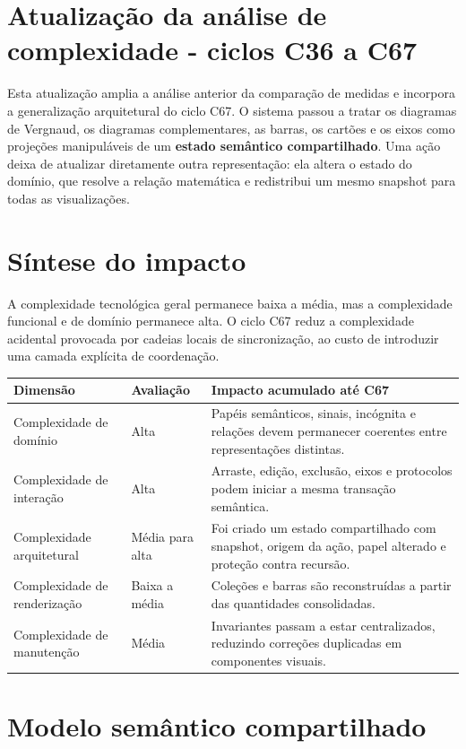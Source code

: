 \documentclass[12pt,a4paper]{article}
\begin{document}
\section*{Atualização da análise de complexidade - ciclos C36 a C67}

Esta atualização amplia a análise anterior da comparação de medidas e incorpora a generalização arquitetural do ciclo C67. O sistema passou a tratar os diagramas de Vergnaud, os diagramas complementares, as barras, os cartões e os eixos como projeções manipuláveis de um \textbf{estado semântico compartilhado}. Uma ação deixa de atualizar diretamente outra representação: ela altera o estado do domínio, que resolve a relação matemática e redistribui um mesmo snapshot para todas as visualizações.

\section{Síntese do impacto}

A complexidade tecnológica geral permanece baixa a média, mas a complexidade funcional e de domínio permanece alta. O ciclo C67 reduz a complexidade acidental provocada por cadeias locais de sincronização, ao custo de introduzir uma camada explícita de coordenação.

\begin{tabularx}{\textwidth}{p{3.8cm}p{2.8cm}X}
\toprule
\textbf{Dimensão} & \textbf{Avaliação} & \textbf{Impacto acumulado até C67}\\
\midrule
Complexidade de domínio & Alta & Papéis semânticos, sinais, incógnita e relações devem permanecer coerentes entre representações distintas.\\
Complexidade de interação & Alta & Arraste, edição, exclusão, eixos e protocolos podem iniciar a mesma transação semântica.\\
Complexidade arquitetural & Média para alta & Foi criado um estado compartilhado com snapshot, origem da ação, papel alterado e proteção contra recursão.\\
Complexidade de renderização & Baixa a média & Coleções e barras são reconstruídas a partir das quantidades consolidadas.\\
Complexidade de manutenção & Média & Invariantes passam a estar centralizados, reduzindo correções duplicadas em componentes visuais.\\
\bottomrule
\end{tabularx}

\section{Modelo semântico compartilhado}
\end{document}
